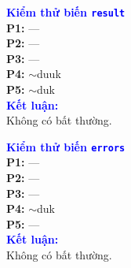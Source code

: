 \documentclass[11pt,a4paper]{article}
\begin{document}
\vspace{4pt}
\noindent
\begin{minipage}[t]{0.485\textwidth}
\begin{tcolorbox}[colback=white, colframe=darkblue!35, boxrule=0.6pt, arc=2pt, left=4pt, right=4pt, top=4pt, bottom=4pt]
\begin{minipage}[t]{0.43\linewidth}
\scriptsize
\textbf{\textcolor{blue}{Kiểm thử biến \texttt{result}}}\\[4pt]
\textbf{P1:} ---\\
\textbf{P2:} ---\\
\textbf{P3:} ---\\
\textbf{P4:} $\sim$duuk\\
\textbf{P5:} $\sim$duk\\[6pt]
\textbf{\textcolor{blue}{Kết luận:}}\\
Không có bất thường.
\end{minipage}\hfill
\begin{minipage}[t]{0.55\linewidth}
\centering
\def\lblStart{}%
\def\lblAone{}%
\def\lblAtwo{}%
\def\lblAthree{}%
\def\lblAfour{}%
\def\lblAfive{}%
\def\lblAsix{}%
\def\lblAseven{}%
\def\lblAeight{}%
\def\lblAnine{}%
\def\lblAten{d(res)}%
\def\lblAeleven{u(res)}%
\def\lblAtwelve{u(res)}%
\def\lblAthirteen{}%
\def\lblAfourteen{}%
\resizebox{\linewidth}{!}{\DrawAssignRoleVarDFG}
\end{minipage}
\end{tcolorbox}
\end{minipage}\hfill
\begin{minipage}[t]{0.485\textwidth}
\begin{tcolorbox}[colback=white, colframe=darkblue!35, boxrule=0.6pt, arc=2pt, left=4pt, right=4pt, top=4pt, bottom=4pt]
\begin{minipage}[t]{0.43\linewidth}
\scriptsize
\textbf{\textcolor{blue}{Kiểm thử biến \texttt{errors}}}\\[4pt]
\textbf{P1:} ---\\
\textbf{P2:} ---\\
\textbf{P3:} ---\\
\textbf{P4:} $\sim$duk\\
\textbf{P5:} ---\\[6pt]
\textbf{\textcolor{blue}{Kết luận:}}\\
Không có bất thường.
\end{minipage}\hfill
\begin{minipage}[t]{0.55\linewidth}
\centering
\def\lblStart{}%
\def\lblAone{}%
\def\lblAtwo{}%
\def\lblAthree{}%
\def\lblAfour{}%
\def\lblAfive{}%
\def\lblAsix{}%
\def\lblAseven{}%
\def\lblAeight{}%
\def\lblAnine{}%
\def\lblAten{}%
\def\lblAeleven{}%
\def\lblAtwelve{d(err)}%
\def\lblAthirteen{u(err)}%
\def\lblAfourteen{}%
\resizebox{\linewidth}{!}{\DrawAssignRoleVarDFG}
\end{minipage}
\end{tcolorbox}
\end{minipage}
\end{document}
